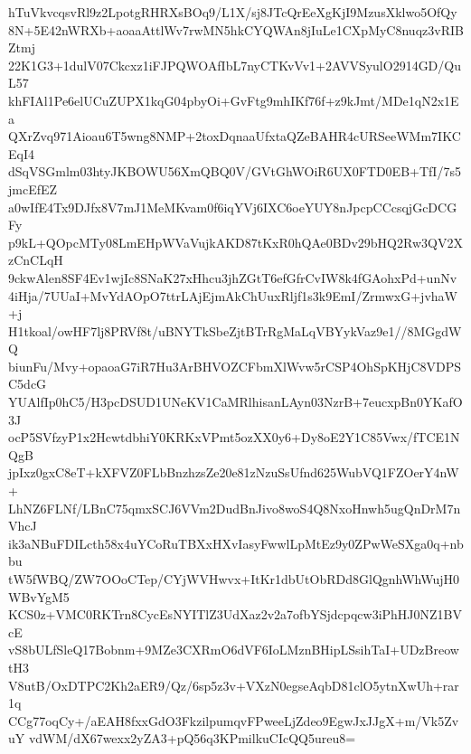 hTuVkvcqsvRl9z2LpotgRHRXsBOq9/L1X/sj8JTcQrEeXgKjI9MzusXklwo5OfQy
8N+5E42nWRXb+aoaaAttlWv7rwMN5hkCYQWAn8jIuLe1CXpMyC8nuqz3vRIBZtmj
22K1G3+1dulV07Ckcxz1iFJPQWOAfIbL7nyCTKvVv1+2AVVSyulO2914GD/QuL57
khFIAl1Pe6elUCuZUPX1kqG04pbyOi+GvFtg9mhIKf76f+z9kJmt/MDe1qN2x1Ea
QXrZvq971Aioau6T5wng8NMP+2toxDqnaaUfxtaQZeBAHR4cURSeeWMm7IKCEqI4
dSqVSGmlm03htyJKBOWU56XmQBQ0V/GVtGhWOiR6UX0FTD0EB+TfI/7s5jmcEfEZ
a0wIfE4Tx9DJfx8V7mJ1MeMKvam0f6iqYVj6IXC6oeYUY8nJpcpCCcsqjGcDCGFy
p9kL+QOpcMTy08LmEHpWVaVujkAKD87tKxR0hQAe0BDv29bHQ2Rw3QV2XzCnCLqH
9ckwAlen8SF4Ev1wjIc8SNaK27xHhcu3jhZGtT6efGfrCvIW8k4fGAohxPd+unNv
4iHja/7UUaI+MvYdAOpO7ttrLAjEjmAkChUuxRljf1s3k9EmI/ZrmwxG+jvhaW+j
H1tkoal/owHF7lj8PRVf8t/uBNYTkSbeZjtBTrRgMaLqVBYykVaz9e1//8MGgdWQ
biunFu/Mvy+opaoaG7iR7Hu3ArBHVOZCFbmXlWvw5rCSP4OhSpKHjC8VDPSC5dcG
YUAlfIp0hC5/H3pcDSUD1UNeKV1CaMRlhisanLAyn03NzrB+7eucxpBn0YKafO3J
ocP5SVfzyP1x2HcwtdbhiY0KRKxVPmt5ozXX0y6+Dy8oE2Y1C85Vwx/fTCE1NQgB
jpIxz0gxC8eT+kXFVZ0FLbBnzhzsZe20e81zNzuSsUfnd625WubVQ1FZOerY4nW+
LhNZ6FLNf/LBnC75qmxSCJ6VVm2DudBnJivo8woS4Q8NxoHnwh5ugQnDrM7nVhcJ
ik3aNBuFDILcth58x4uYCoRuTBXxHXvIasyFwwlLpMtEz9y0ZPwWeSXga0q+nbbu
tW5fWBQ/ZW7OOoCTep/CYjWVHwvx+ItKr1dbUtObRDd8GlQgnhWhWujH0WBvYgM5
KCS0z+VMC0RKTrn8CycEsNYITlZ3UdXaz2v2a7ofbYSjdcpqcw3iPhHJ0NZ1BVcE
vS8bULfSleQ17Bobnm+9MZe3CXRmO6dVF6IoLMznBHipLSsihTaI+UDzBreowtH3
V8utB/OxDTPC2Kh2aER9/Qz/6sp5z3v+VXzN0egseAqbD81clO5ytnXwUh+rar1q
CCg77oqCy+/aEAH8fxxGdO3FkzilpumqvFPweeLjZdeo9EgwJxJJgX+m/Vk5ZvuY
vdWM/dX67wexx2yZA3+pQ56q3KPmilkuCIcQQ5ureu8=
